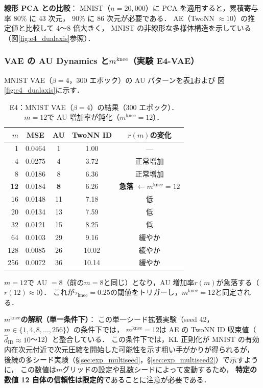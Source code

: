 \documentclass[11pt,a4paper]{jsarticle}
\newcommand{\mknee}{m^{\mathrm{knee}}}
\begin{document}
\textbf{線形 PCA との比較}：
MNIST（$n = 20{,}000$）に PCA を適用すると，累積寄与率 80\% に 43 次元，
90\% に 86 次元が必要である．
AE（TwoNN $\approx 10$）の推定値と比較して 4〜8 倍大きく，
MNIST の非線形な多様体構造を示している（図\ref{fig:e4_dualaxis}参照）．

\subsubsection{VAE の AU Dynamics と$\mknee$（実験 E4-VAE）}

MNIST VAE（$\beta = 4$，300 エポック）の AU パターンを表\ref{tab:e4_vae}および
図\ref{fig:e4_dualaxis}に示す．

\begin{table}[H]
\centering
\caption{E4：MNIST VAE（$\beta=4$）の結果（300 エポック）．
$m = 12$で AU 増加率が鈍化（$\mknee = 12$）．}
\label{tab:e4_vae}
\small
\begin{tabular}{rcccc}
\toprule
$m$ & MSE & AU & TwoNN ID & $r(m)$の変化 \\
\midrule
1   & 0.0464 & 1  & 1.00 & --- \\
4   & 0.0275 & 4  & 3.72 & 正常増加 \\
8   & 0.0186 & 8  & 6.36 & 正常増加 \\
\textbf{12} & 0.0184 & \textbf{8}  & 6.26 & \textbf{急落} $\leftarrow \mknee = 12$ \\
16  & 0.0148 & 11 & 7.18 & 低 \\
20  & 0.0134 & 13 & 7.59 & 低 \\
32  & 0.0121 & 15 & 8.25 & 低 \\
64  & 0.0103 & 29 & 9.16 & 緩やか \\
128 & 0.0085 & 26 & 10.02 & 緩やか \\
256 & 0.0072 & 36 & 10.14 & 緩やか \\
\bottomrule
\end{tabular}
\end{table}

$m = 12$で AU $= 8$（前の$m = 8$と同じ）となり，AU 増加率$r(m)$が急落する（$r(12) \approx 0$）．
これが$\tau_{\mathrm{knee}} = 0.25$の閾値をトリガーし，$\mknee = 12$と同定される．

\textbf{$\mknee$の解釈（単一条件下）}：
この単一シード拡張実験（seed 42，$m \in \{1,4,8,\ldots,256\}$）の条件下では，
$\mknee = 12$は AE の TwoNN ID 収束値（$\hat{d}_\mathrm{ID} \approx 10$〜12）と整合している．
この条件下では，KL 正則化が MNIST の有効内在次元付近で次元圧縮を開始した可能性を示す粗い手がかりが得られるが，
後続の多シード実験（§\ref{sec:exp_multiseed}，§\ref{sec:exp_multiseed2}）で示すように，
この数値は$m$グリッドの設定や乱数シードによって変動するため，
\textbf{特定の数値 12 自体の信頼性は限定的}であることに注意が必要である．
\end{document}
